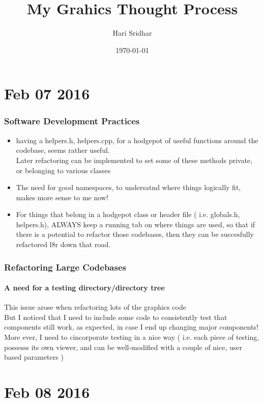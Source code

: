 \documentclass{article}
\begin{document}
\title*{My Grahics Thought Process}
\author{Hari Sridhar}
\date{\today}
\newpage

\part{Feb 07 2016}
\section{Software Development Practices}
\begin{itemize}
	\item having a helpers.h, helpers.cpp, for a hodgepot of useful functions around the codebase, seems rather useful. 
	\\ Later refactoring can be implemented to set some of these methods private, or belonging to various classes
	\item The need for good namespaces, to undersatnd where things logically fit, makes more sense to me now!
	\item For things that belong in a hodgepot class or header file ( i.e. globals.h, helpers.h), ALWAYS keep a running tab on where things are used, so that if there is a potential to refactor those codebases, then they can be succesfully refactored l8r down that road.
\end{itemize}

\section{Refactoring Large Codebases}
\subsection{A need for a testing directory/directory tree}
This issue arose when refactoring lots of the graphics code
\\ But I noticed that I need to include some code to consistently test that components still work, as expected, in case I end up changing major components!
\\ More ever, I need to cincorporate testing in a nice way ( i.e. each piece of testing, possesss its own viewer, and can be well-modified with a couple of nice, user based parameters )
\newpage

\part{Feb 08 2016}
\end{document}
